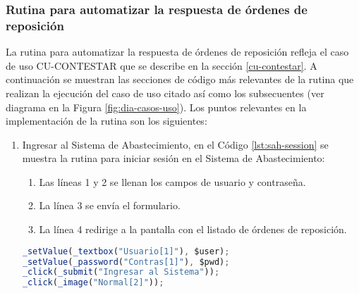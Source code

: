 \subsubsection{Rutina para automatizar la respuesta de órdenes de reposición}\label{sec-aut-contestar}
La rutina para automatizar la respuesta de órdenes de reposición refleja el caso de uso  CU-CONTESTAR que se describe en la sección \ref{cu-contestar}. A continuación se muestran las secciones de código más relevantes de la rutina que realizan la ejecución del caso de uso citado así como los subsecuentes (ver diagrama en la Figura \ref{fig:dia-casos-uso}). Los puntos relevantes en la implementación de la rutina son los siguientes:
\begin{enumerate}
	\item Ingresar al Sistema de Abastecimiento, en el Código \ref{lst:sah-session} se muestra la rutina para iniciar sesión en el Sistema de Abastecimiento:
	\begin{enumerate}
		\item Las líneas 1 y 2 se llenan los campos de usuario y contraseña.
		\item La línea 3 se envía el formulario.
		\item La línea 4 redirige a la pantalla con el listado de órdenes de reposición.  
	\end{enumerate}
	\begin{lstlisting}[language=Javascript, caption={Inicio de sesión en el Sistema de Abastecimiento.}, captionpos=b, label={lst:sah-session}]
_setValue(_textbox("Usuario[1]"), $user);
_setValue(_password("Contras[1]"), $pwd);
_click(_submit("Ingresar al Sistema"));
_click(_image("Normal[2]"));
	\end{lstlisting}


\end{enumerate}
